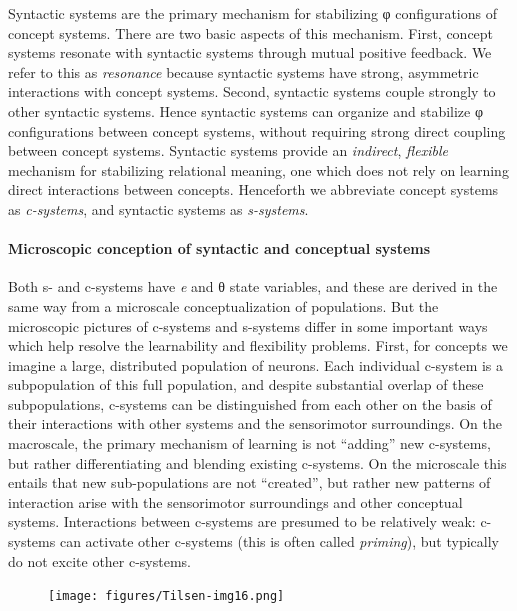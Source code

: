 Syntactic systems are the primary mechanism for stabilizing φ configurations of concept systems. There are two basic aspects of this mechanism. First, concept systems resonate with syntactic systems through mutual positive feedback. We refer to this as \textit{resonance} because syntactic systems have strong, asymmetric interactions with concept systems. Second, syntactic systems couple strongly to other syntactic systems. Hence syntactic systems can organize and stabilize φ configurations between concept systems, without requiring strong direct coupling between concept systems. Syntactic systems provide an \textit{indirect}, \textit{flexible} mechanism for stabilizing relational meaning, one which does not rely on learning direct interactions between concepts. Henceforth we abbreviate concept systems as \textit{c-systems}, and syntactic systems as \textit{s-systems}. 

\paragraph{Microscopic conception of syntactic and conceptual systems}

Both s- and c-systems have \textit{e} and θ state variables, and these are derived in the same way from a microscale conceptualization of populations. But the microscopic pictures of c-systems and s-systems differ in some important ways which help resolve the learnability and flexibility problems. First, for concepts we imagine a large, distributed population of neurons. Each individual c-system is a subpopulation of this full population, and despite substantial overlap of these subpopulations, c-systems can be distinguished from each other on the basis of their interactions with other systems and the sensorimotor surroundings. On the macroscale, the primary mechanism of learning is not “adding” new c-systems, but rather differentiating and blending existing c-systems. On the microscale this entails that new sub-populations are not “created”, but rather new patterns of interaction arise with the sensorimotor surroundings and other conceptual systems. Interactions between c-systems are presumed to be relatively weak: c-systems can activate other c-systems (this is often called \textit{priming}), but typically do not excite other c-systems.

  
\begin{figure}
\texttt{[image: figures/Tilsen-img16.png]}
\caption{\missingcaption}
\label{fig:}
\end{figure}
 

